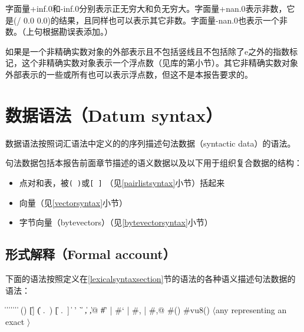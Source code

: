 字面量{\cf +inf.0}和{\cf -inf.0}分别表示正无穷大和负无穷大。字面量{\cf +nan.0}表示非数，它是{\cf (/ 0.0 0.0)}的结果，且同样也可以表示其它非数。字面量{\cf -nan.0}也表示一个非数。（上句根据勘误表添加。）

如果是一个非精确实数对象的外部表示且不包括竖线且不包括除了{\cf e}之外的指数标记，这个非精确实数对象表示一个浮点数（见库的第小节）。其它非精确实数对象外部表示的一些或所有也可以表示浮点数，但这不是本报告要求的。

\section{数据语法（Datum syntax）}
\label{datumsyntaxsection}

数据语法按照词汇语法中定义的的序列描述句法数据（syntactic data）的语法。

句法数据包括本报告前面章节描述的语义数据以及以下用于组织复合数据的结构：
%
\begin{itemize}
\item 点对和表，被\verb|( )|或\verb|[ ]| （见\ref{pairlistsyntax}小节）括起来
\item 向量（见\ref{vectorsyntax}小节）
\item 字节向量（bytevectors）（见\ref{bytevectorsyntax}小节）
\end{itemize}

\subsection{形式解释（Formal account）}
\label{datumsyntax}

下面的语法按照定义在\ref{lexicalsyntaxsection}节的语法的各种语义描述句法数据的语法：

\begin{grammar}%
 \: 
\>  \| 
 \:  \| 
\>  \|  \|  \|  
 \: 
 \:  \|  \| 
 \: () \| []
\>    \| ( .\ ) \| [ .\ ]
\>    \| 
 \:  
 \: ' \| ` \| , \| ,@
\>    \| \#' | \#` | \#, | \#,@
 \: \#()
 \: \#vu8()
 \: $\langle${\rm any  representing an exact}
 \>\>\quad{}$\rangle$%
\end{grammar}

